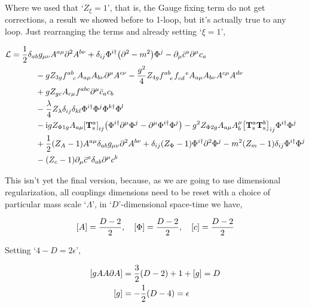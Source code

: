 Where we used that `$Z_\xi=1$', that is, the Gauge fixing term do not get corrections, a result we showed 
before to 1-loop, but it's actually true to any loop. Just rearranging the terms and already setting `$\xi=1$',

\begin{align}
    \mathcal L&=\frac12\delta_{ab}g_{\mu\nu}A^{a\mu}\partial^2A^{b\nu}+\delta_{ij}\Phi^{i\dagger}\qty(\partial^2-m^2)\Phi^j-\partial_\mu\bar c^a\partial^\mu c_a\nonumber\\
    &\quad\quad\quad-gZ_{3g}\tensor{f}{^a^b_c}A_{a\mu}A_{b\nu}\partial^\mu A^{c\nu}-\frac{g^2}{4}Z_{4g}\tensor{f}{^a^b_e}\tensor{f}{_c_d^e}A_{a\mu}A_{b\nu}A^{c\mu}A^{d\nu}\nonumber\\
    &\quad\quad\quad +g Z_{gc}A_{c\mu}\tensor{f}{^a^b^c}\partial^\mu \bar c_ac_b\nonumber\\
    &\quad\quad\quad-\frac\lambda4Z_\lambda\delta_{ij}\delta_{kl}\Phi^{i\dagger}\Phi^{j}\Phi^{k\dagger}\Phi^{l}\nonumber\\
    &\quad\quad\quad
    -\im gZ_{\Phi 1g}A_{a\mu}\tensor{\qty[\vb T^{a}_{\textnormal s}]}{_i_j}\qty(\Phi^{i\dagger}\partial^\mu\Phi^j-\partial^\mu\Phi^{i\dagger}\Phi^j)
    -g^2Z_{\Phi 2g}A_{a\mu}A_b^\mu
    \tensor{\qty[\vb T^{a}_{\textnormal s}\vb T^b_{\textnormal s}]}{_i_j}
    \Phi^{i\dagger}\Phi^j\nonumber\\
    &\quad\quad\quad+\frac12\qty(Z_A-1)A^{a\mu}\delta_{ab}g_{\mu\nu}\partial^2A^{b\nu}+\delta_{ij}\qty(Z_\Phi-1)\Phi^{i\dagger}\partial^2\Phi^j-m^2\qty(Z_m-1)\delta_{ij}\Phi^{i\dagger}\Phi^j\nonumber\\
    &\quad\quad\quad-\qty(Z_c-1)\partial_\mu \bar c^a\delta_{ab}\partial^\mu c^b\nonumber
\end{align}

This isn't yet the final version, because, as we are going to use dimensional regularization, 
all couplings dimensions need to be reset with a choice of particular mass scale `$\Lambda$', 
in `$D$'-dimensional space-time we have,

\begin{align}
    \qty[A]=\frac{D-2}{2},\ \ \ \qty[\Phi]=\frac{D-2}{2},\ \ \ \qty[c]=\frac{D-2}{2}\nonumber
\end{align}

Setting `$4-D=2\epsilon$',

\begin{align}
    \qty[gAA\partial A]&=\frac32\qty(D-2)+1+\qty[g]=D\nonumber\\
    \qty[g]&=-\frac12 \qty(D-4)=\epsilon
\end{align}


